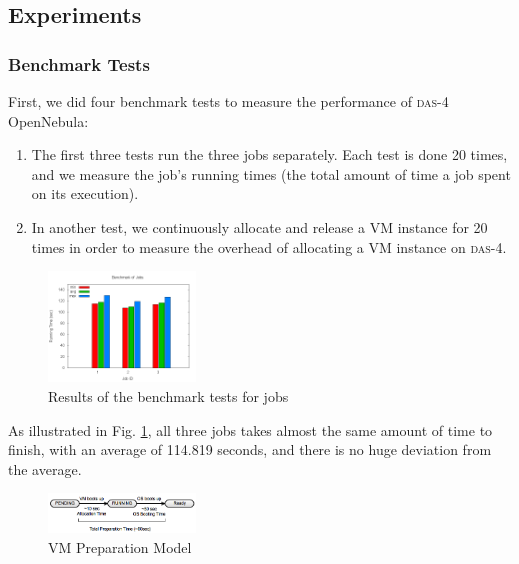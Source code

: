 \subsection{Experiments}

\subsubsection{Benchmark Tests}
First, we did four benchmark tests to measure the performance of
\textsc{das-4} OpenNebula:

\begin{enumerate}
\item The first three tests run the three jobs separately. Each
  test is done 20 times, and we measure the job's running times
  (the total amount of time a job spent on its execution).
\item In another test, we continuously allocate and release a VM
  instance for 20 times in order to measure the overhead of allocating
  a VM instance on \textsc{das-4}.
\end{enumerate}

\begin{figure}[!t]
\centering
\includegraphics[width=0.35\textwidth]{pictures/benchmark-jobs.png}
\caption{Results of the benchmark tests for jobs}
\label{figure_jobbenchmark}
\end{figure}

As illustrated in Fig. \ref{figure_jobbenchmark}, all three jobs takes
almost the same amount of time to finish, with an average of 114.819 seconds, and there is no huge deviation from the average.

\begin{figure}
\centering
\includegraphics[width=0.35\textwidth]{pictures/vm-preparation-model.png}
\caption{VM Preparation Model}
\label{figure_vm_preparation_model}
\end{figure}

